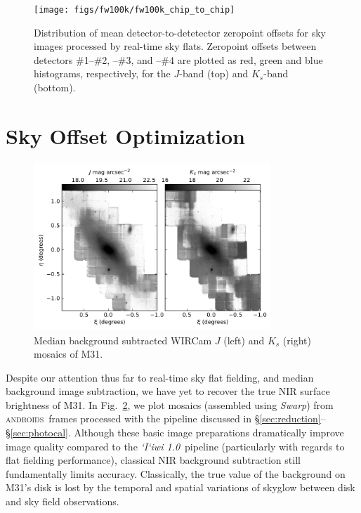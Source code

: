 \documentclass[iop]{emulateapj}
\newcommand{\sw}[1]{\textit{#1}} %
\newcommand{\iiwione}{\sw{`I`iwi 1.0}}
\newcommand{\androids}{\textsc{androids}}
\newcommand{\Fig}[1]{Fig.~\ref{fig:#1}}  %
\newcommand{\Sec}[1]{\S\ref{sec:#1}}  %
\begin{document}
\begin{figure}[t]
\centering
\texttt{[image: figs/fw100k/fw100k\_chip\_to\_chip]}
\caption{Distribution of mean detector-to-detetector zeropoint offsets for sky images processed by real-time sky flats. Zeropoint offsets between detectors \#1--\#2, --\#3, and --\#4 are plotted as
red, green and blue histograms, respectively, for the $J$-band (top) and $K_s$-band (bottom).}
\label{fig:fw100k_chip_to_chip}
\end{figure}

\section{Sky Offset Optimization}
\label{sec:scalar}

\begin{figure}[t]
\centering
\includegraphics[width=3.5in]{figs/raw_mosaics}
\caption{Median background subtracted WIRCam $J$ (left) and $K_s$ (right) mosaics of M31.}
\label{fig:raw_mosaics}
\end{figure}

Despite our attention thus far to real-time sky flat fielding, and median background image subtraction, we have yet to recover the true NIR surface brightness of M31.
In \Fig{raw_mosaics}, we plot mosaics (assembled using \sw{Swarp}) from \androids\ frames processed with the pipeline discussed in \Sec{reduction}--\Sec{photocal}.
Although these basic image preparations dramatically improve image quality compared to the \iiwione\ pipeline (particularly with regards to flat fielding performance), classical NIR background subtraction still fundamentally limits accuracy.
Classically, the true value of the background on M31's disk is lost by the temporal and spatial variations of skyglow between disk and sky field observations.
\end{document}
